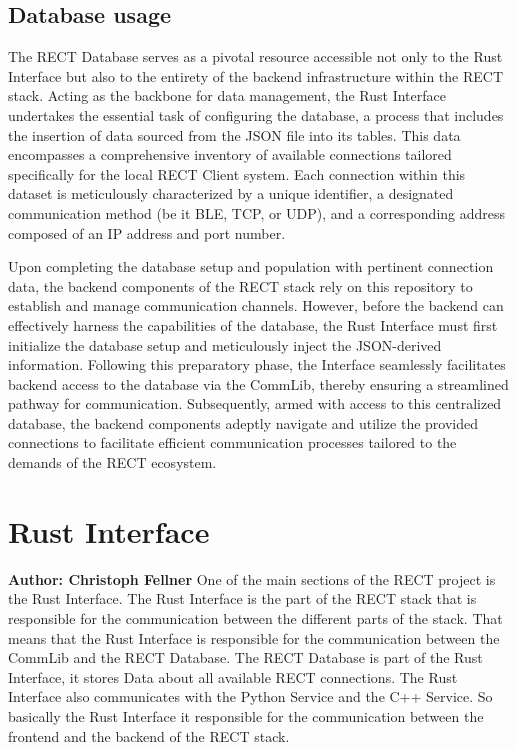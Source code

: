 \subsection{Database usage}

The RECT Database serves as a pivotal resource accessible not only to the Rust Interface but also to the entirety of the backend infrastructure within the RECT stack. 
Acting as the backbone for data management, the Rust Interface undertakes the essential task of configuring the database, a process that includes the insertion of data 
sourced from the JSON file into its tables. This data encompasses a comprehensive inventory of available connections tailored specifically for the local RECT Client system.
Each connection within this dataset is meticulously characterized by a unique identifier, a designated communication method (be it BLE, TCP, or UDP), and a corresponding 
address composed of an IP address and port number.\newline

Upon completing the database setup and population with pertinent connection data, the backend components of the RECT stack rely on this repository to establish and manage 
communication channels. However, before the backend can effectively harness the capabilities of the database, the Rust Interface must first initialize the database setup 
and meticulously inject the JSON-derived information. Following this preparatory phase, the Interface seamlessly facilitates backend access to the database via the CommLib,
thereby ensuring a streamlined pathway for communication. Subsequently, armed with access to this centralized database, the backend components adeptly navigate and utilize
the provided connections to facilitate efficient communication processes tailored to the demands of the RECT ecosystem.

\section{Rust Interface}
\textbf{Author: Christoph Fellner}
One of the main sections of the RECT project is the Rust Interface. The Rust Interface is the part of the RECT stack that is responsible for the communication between 
the different parts of the stack. That means that the Rust Interface is responsible for the communication between the CommLib and the RECT Database. The RECT Database is 
part of the Rust Interface, it stores Data about all available RECT connections. The Rust Interface also communicates with the Python Service and the C++ Service. So 
basically the Rust Interface it responsible for the communication between the frontend and the backend of the RECT stack.\newline

